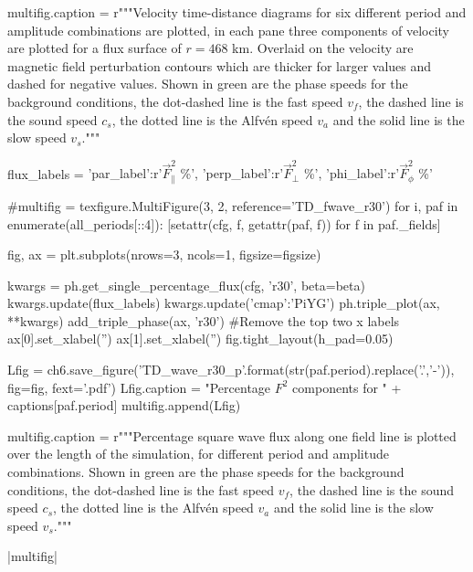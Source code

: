\begin{pycode}[chapter6]
multifig.caption = r"""Velocity time-distance diagrams for six different period and amplitude combinations are plotted, in each pane three components of velocity are plotted for a flux surface of $r=468$ km. Overlaid on the velocity are magnetic field perturbation contours which are thicker for larger values and dashed for negative values. Shown in green are the phase speeds for the background conditions, the dot-dashed line is the fast speed $v_f$, the dashed line is the sound speed $c_s$, the dotted line is the Alfv\'en speed $v_a$ and the solid line is the slow speed $v_s$."""

\end{pycode}



\begin{pycode}[chapter6]
flux_labels = {'par_label':r'$ \vec{F}_\parallel^2$ \%', 
               'perp_label':r'$ \vec{F}_\perp^2$ \%',
               'phi_label':r'$ \vec{F}_\phi^2$ \%'}

#multifig = texfigure.MultiFigure(3, 2, reference='TD_fwave_r30')
for i, paf in enumerate(all_periods[::4]):
    [setattr(cfg, f, getattr(paf, f)) for f in paf._fields]
    
    fig, ax = plt.subplots(nrows=3, ncols=1, figsize=figsize)
    
    kwargs = ph.get_single_percentage_flux(cfg, 'r30', beta=beta)
    kwargs.update(flux_labels)
    kwargs.update({'cmap':'PiYG'})
    ph.triple_plot(ax, **kwargs)
    add_triple_phase(ax, 'r30')
    #Remove the top two x labels
    ax[0].set_xlabel('')
    ax[1].set_xlabel('')
    fig.tight_layout(h_pad=0.05)
    
    Lfig = ch6.save_figure('TD_wave_r30_p{}'.format(str(paf.period).replace('.','-')), fig=fig, fext='.pdf')
    Lfig.caption = "Percentage $F^2$ components for " + captions[paf.period]
    multifig.append(Lfig)

multifig.caption = r"""Percentage square wave flux along one field line is plotted over the length of the simulation, for different period and amplitude combinations. Shown in green are the phase speeds for the background conditions, the dot-dashed line is the fast speed $v_f$, the dashed line is the sound speed $c_s$, the dotted line is the Alfv\'en speed $v_a$ and the solid line is the slow speed $v_s$."""

\end{pycode}

\py[chapter6]|multifig|


